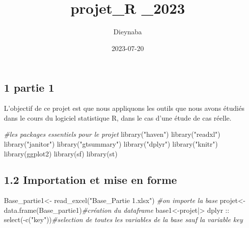 \documentclass[
]{article}
\title{projet\_R \_2023}
\author{Dieynaba}
\date{2023-07-20}
\newenvironment{Shaded}{\begin{snugshade}}{\end{snugshade}}
\newcommand{\CommentTok}[1]{\textcolor[rgb]{0.56,0.35,0.01}{\textit{#1}}}
\newcommand{\FunctionTok}[1]{\textcolor[rgb]{0.00,0.00,0.00}{#1}}
\newcommand{\NormalTok}[1]{#1}
\newcommand{\OtherTok}[1]{\textcolor[rgb]{0.56,0.35,0.01}{#1}}
\newcommand{\SpecialCharTok}[1]{\textcolor[rgb]{0.00,0.00,0.00}{#1}}
\newcommand{\StringTok}[1]{\textcolor[rgb]{0.31,0.60,0.02}{#1}}
\begin{document}
\maketitle

\hypertarget{partie-1}{%
\subsection{1 partie 1}\label{partie-1}}

L'objectif de ce projet est que nous appliquons les outils que nous
avons étudiés dans le cours du logiciel statistique R, dans le cas d'une
étude de cas réelle.

\begin{Shaded}
\begin{Highlighting}[]
\CommentTok{\#les packages essentiels pour le projet}
\FunctionTok{library}\NormalTok{(}\StringTok{"haven"}\NormalTok{)}
\FunctionTok{library}\NormalTok{(}\StringTok{"readxl"}\NormalTok{)}
\FunctionTok{library}\NormalTok{(}\StringTok{"janitor"}\NormalTok{)}
\FunctionTok{library}\NormalTok{(}\StringTok{"gtsummary"}\NormalTok{)}
\FunctionTok{library}\NormalTok{(}\StringTok{"dplyr"}\NormalTok{)}
\FunctionTok{library}\NormalTok{(}\StringTok{"knitr"}\NormalTok{)}
\FunctionTok{library}\NormalTok{(ggplot2)}
\FunctionTok{library}\NormalTok{(sf)}
\FunctionTok{library}\NormalTok{(st)}
\end{Highlighting}
\end{Shaded}

\hypertarget{importation-et-mise-en-forme}{%
\subsection{1.2 Importation et mise en
forme}\label{importation-et-mise-en-forme}}

\begin{Shaded}
\begin{Highlighting}[]
\NormalTok{Base\_partie1}\OtherTok{\textless{}{-}} \FunctionTok{read\_excel}\NormalTok{(}\StringTok{"Base\_Partie 1.xlsx"}\NormalTok{) }\CommentTok{\#on importe la base}
\NormalTok{projet}\OtherTok{\textless{}{-}}\FunctionTok{data.frame}\NormalTok{(Base\_partie1)}\CommentTok{\#création du dataframe}
\NormalTok{base1}\OtherTok{\textless{}{-}}\NormalTok{projet}\SpecialCharTok{|\textgreater{}}\NormalTok{ dplyr }\SpecialCharTok{::} \FunctionTok{select}\NormalTok{(}\SpecialCharTok{{-}}\FunctionTok{c}\NormalTok{(}\StringTok{"key"}\NormalTok{))}\CommentTok{\#selection de toutes les variables de la base sauf la variable key}
\end{Highlighting}
\end{Shaded}
\end{document}
